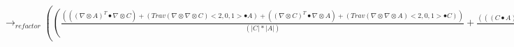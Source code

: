 \documentclass{article}
\begin{document}
\newline $\rightarrow_{refactor}(( \frac{((( \nabla  \otimes A)^T \bullet  \nabla  \otimes C)+(Trav( \nabla  \otimes  \nabla  \otimes C)<2,0,1> \bullet A)+(( \nabla  \otimes C)^T \bullet  \nabla  \otimes A)+(Trav( \nabla  \otimes  \nabla  \otimes A)<2,0,1> \bullet C))}{(|C|*|A|)}+ \frac{(((C \bullet A)*((A \bullet  \nabla  \otimes A) \otimes (A \bullet  \nabla  \otimes A)))+(2*(C \bullet A)*((A \bullet  \nabla  \otimes A) \otimes (A \bullet  \nabla  \otimes A))))}{(|A|*|C|*((A \bullet A))^2)}+ \frac{((((C \bullet A)*((A \bullet  \nabla  \otimes A)*(C \bullet  \nabla  \otimes C))))^T+((C \bullet A)*((A \bullet  \nabla  \otimes A) \otimes (C \bullet  \nabla  \otimes C))))}{((C \bullet C)*|A|*|C|*(A \bullet A))}+ \frac{((C \bullet A)*((C \bullet  \nabla  \otimes C) \otimes (C \bullet  \nabla  \otimes C)))}{(|C|*|A|*((C \bullet C))^2)}+ \frac{(2*|C|*(C \bullet A)*((C \bullet  \nabla  \otimes C) \otimes (C \bullet  \nabla  \otimes C)))}{(|A|*(C \bullet C)*((C \bullet C))^2)})-( \frac{((((((((( \nabla  \otimes C)^T \bullet A) \otimes (A \bullet  \nabla  \otimes A)))+((C \bullet A)*(A \bullet  \nabla  \otimes  \nabla  \otimes A)))+((C \bullet A)*(( \nabla  \otimes A)^T \bullet  \nabla  \otimes A)))+((((( \nabla  \otimes C)^T \bullet A)*(A \bullet  \nabla  \otimes A))))^T)+((((C \bullet  \nabla  \otimes A)*(A \bullet  \nabla  \otimes A))))^T)+(((C \bullet  \nabla  \otimes A) \otimes (A \bullet  \nabla  \otimes A))))}{(|C|*|A|*(A \bullet A))}+ \frac{(((((((( \nabla  \otimes C)^T \bullet A)*(C \bullet  \nabla  \otimes C))))^T+(((( \nabla  \otimes C)^T \bullet A) \otimes (C \bullet  \nabla  \otimes C))))+((((C \bullet  \nabla  \otimes A)*(C \bullet  \nabla  \otimes C))))^T)+(((( \nabla  \otimes A)^T \bullet C) \otimes (C \bullet  \nabla  \otimes C))))}{(|A|*|C|*(C \bullet C))}+ \frac{((|C|*(C \bullet A)*(( \nabla  \otimes C)^T \bullet  \nabla  \otimes C))+(|C|*(C \bullet A)*(C \bullet  \nabla  \otimes  \nabla  \otimes C)))}{(|A|*(C \bullet C)*(C \bullet C))}))$\\
\end{document}
